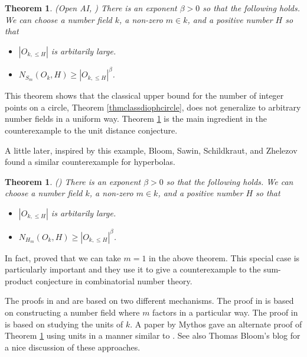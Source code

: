 \documentclass{amsart}
\newtheorem{theorem}[prop]{Theorem}
\begin{document}
\begin{theorem} \label{countercircle} (Open AI, \cite{OAI}) There is an exponent $\beta > 0$ so that the following holds.   We can choose a number field $k$, 
a non-zero $m \in k$,  and a positive number $H$ so that 

\begin{itemize}

\item $|O_{k, \le H}|$ is arbitarily large.

\item $N_{S_m}(O_k,H) \ge |O_{k, \le H}|^\beta$.

\end{itemize}

\end{theorem}

This theorem shows that the classical upper bound for the number of integer points on a circle, Theorem \ref{thmclassdiophcircle}, does not generalize to arbitrary number fields in a uniform way.   Theorem \ref{countercircle} is the main ingredient in the counterexample to the unit distance conjecture.

A little later, inspired by this example,  Bloom,  Sawin,  Schildkraut, and Zhelezov found a similar counterexample for hyperbolas.

\begin{theorem} \label{counterhyp} (\cite{BSSZ}) There is an exponent $\beta > 0$ so that the following holds.   We can choose a number field $k$, 
a non-zero $m \in k$,  and a positive number $H$ so that 

\begin{itemize}

\item $|O_{k, \le H}|$ is arbitarily large.

\item $N_{H_m}(O_k,H) \ge |O_{k, \le H}|^\beta$.

\end{itemize}

\end{theorem}

In fact,  \cite{BSSZ} proved that we can take $m=1$ in the above theorem.   This special case is particularly important and they use it to give a counterexample to the sum-product conjecture in combinatorial number theory.  

The proofs in \cite{OAI} and \cite{BSSZ} are based on two different mechanisms.   The proof in \cite{OAI} is based on constructing a number field where $m$ factors in a particular way.  The proof in \cite{BSSZ} is based on studying the units of $k$.  
 A paper by Mythos \cite{Anth} gave an alternate proof of Theorem \ref{countercircle} using units in a manner similar to \cite{BSSZ}.   See also Thomas Bloom's blog \cite{Bl} for a nice discussion of these approaches.  
 
\end{document}
